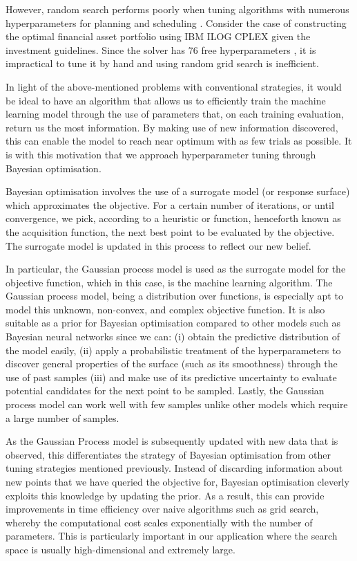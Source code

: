 \documentclass[letterpaper]{article}
\begin{document}
However, random search performs poorly when tuning algorithms with numerous hyperparameters for planning and scheduling \cite{snoek2012practical}. Consider the case of constructing the optimal financial asset portfolio using IBM ILOG CPLEX given the investment guidelines. Since the solver has 76 free hyperparameters \cite{shahriari2016taking}, it is impractical to tune it by hand and using random grid search is inefficient.

In light of the above-mentioned problems with conventional strategies, it would be ideal
to have an algorithm that allows us to efficiently train the machine learning model
through the use of parameters that, on each training evaluation, return us the
most information. By making use of new information discovered, this can enable the
model to reach near optimum with as few trials as possible.
It is with this motivation that we approach hyperparameter tuning through Bayesian optimisation.

Bayesian optimisation involves the use of a surrogate model (or response surface)
\cite{brochu2010tutorial}
which approximates the objective. For a certain number of iterations, or until
convergence, we pick, according to a heuristic or function, henceforth known as the
acquisition function, the next best point to be evaluated by the objective. The
surrogate model is updated in this process to reflect our new belief.

In particular, the Gaussian process model is used as the surrogate model
for the objective function, which in this case, is the machine learning algorithm.
The Gaussian process model, being a distribution over functions, is especially apt
to model this unknown, non-convex, and complex objective function. It is also
suitable as a prior for Bayesian optimisation compared to other
models such as Bayesian neural networks \cite{snoek2015scalable} since we can: (i) obtain the 
predictive distribution of the model easily, (ii) apply a probabilistic treatment of the
hyperparameters to discover general properties of the surface (such as its
smoothness) through the use of past samples (iii) and make use of its predictive
uncertainty to evaluate potential candidates for the next point to be sampled.
Lastly, the Gaussian process model can work well with few samples unlike other
models which require a large number of samples.

As the Gaussian Process model is subsequently updated with new data that is observed,
this differentiates the strategy of Bayesian optimisation from other tuning
strategies mentioned previously.
Instead of discarding information about new points that we have queried the
objective for, Bayesian optimisation cleverly exploits this
knowledge by updating the prior. As a result, this can provide improvements in time
efficiency over naive algorithms such as grid search, whereby the computational
cost scales exponentially with the number of parameters. This is particularly
important in our application where the search space is usually high-dimensional
and extremely large.
\end{document}
